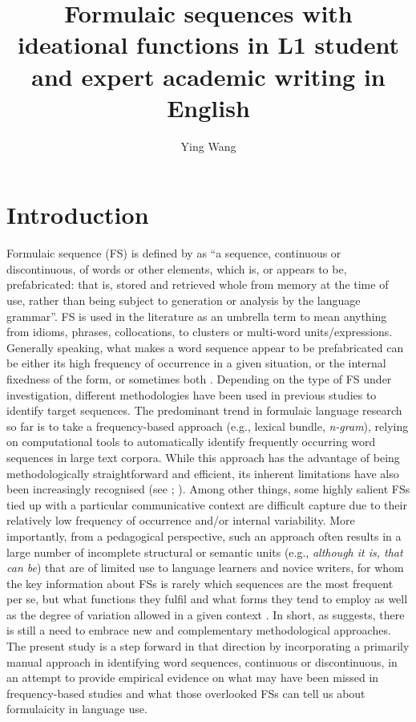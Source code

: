 \documentclass[output=paper]{langscibook}
\author{Ying Wang\affiliation{Karlstad University}}
\title[Formulaic sequences in L1 student and expert academic writing in English]{Formulaic sequences with ideational functions in L1 student and expert academic writing in English}
\begin{document}
\maketitle 


\section{Introduction}

Formulaic sequence (FS) is defined by \citet[9]{Wray2002} as “a sequence, continuous or discontinuous, of words or other elements, which is, or appears to be, prefabricated: that is, stored and retrieved whole from memory at the time of use, rather than being subject to generation or analysis by the language grammar”. FS is used in the literature as an umbrella term to mean anything from idioms, phrases, collocations, to clusters or multi-word units/expressions. Generally speaking, what makes a word sequence appear to be prefabricated can be either its high frequency of occurrence in a given situation, or the internal fixedness of the form, or sometimes both \citep{Siyanova-Chanturia2013}. Depending on the type of FS under investigation, different methodologies have been used in previous studies to identify target sequences. The predominant trend in formulaic language research so far is to take a frequency-based approach (e.g., lexical bundle, \textit{n-gram}), relying on computational tools to automatically identify frequently occurring word sequences in large text corpora. While this approach has the advantage of being methodologically straightforward and efficient, its inherent limitations have also been increasingly recognised (see \citealt{ÄdelErman2012}; \citealt{Wang2018}). Among other things, some highly salient FSs tied up with a particular communicative context are difficult capture due to their relatively low frequency of occurrence and/or internal variability. More importantly, from a pedagogical perspective, such an approach often results in a large number of incomplete structural or semantic units (e.g., \textit{although it is, that can be}) that are of limited use to language learners and novice writers, for whom the key information about FSs is rarely which sequences are the most frequent per se, but what functions they fulfil and what forms they tend to employ as well as the degree of variation allowed in a given context \citep{DurrantMathews-Aydınlı2010}. In short, as \citet{Biber2009} suggests, there is still a need to embrace new and complementary methodological approaches. The present study is a step forward in that direction by incorporating a primarily manual approach in identifying word sequences, continuous or discontinuous, in an attempt to provide empirical evidence on what may have been missed in frequency-based studies and what those overlooked FSs can tell us about formulaicity in language use.
\end{document}
